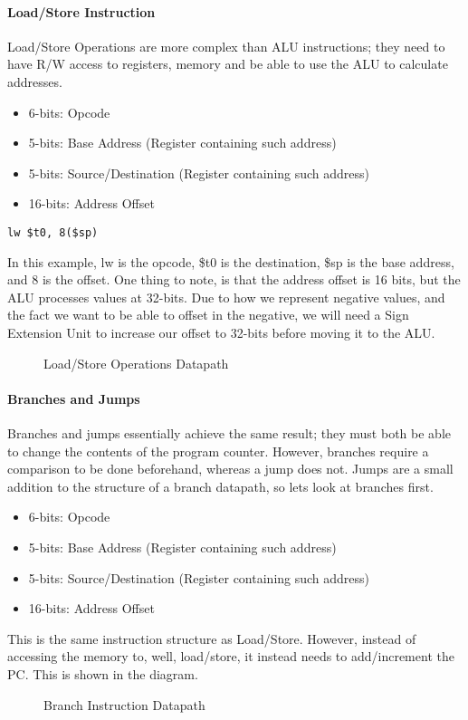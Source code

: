 \paragraph{Load/Store Instruction}
Load/Store Operations are more complex than ALU instructions; they need to have R/W access to registers, memory and be able to use the ALU to calculate addresses.
\begin{itemize}
	\item 6-bits: Opcode
	\item 5-bits: Base Address (Register containing such address)
	\item 5-bits: Source/Destination (Register containing such address)
	\item 16-bits: Address Offset
\end{itemize}
\begin{verbatim}
lw $t0, 8($sp)
\end{verbatim}
In this example, lw is the opcode, \$t0 is the destination, \$sp is the base address, and 8 is the offset.
One thing to note, is that the address offset is 16 bits, but the ALU processes values at 32-bits. Due to how we represent negative values, and the fact we want to be able to offset in the negative, we will need a Sign Extension Unit to increase our offset to 32-bits before moving it to the ALU.
\begin{figure}[!htb]
	\caption{\label{fig:loadstore} Load/Store Operations Datapath}
\end{figure}
\paragraph{Branches and Jumps}
Branches and jumps essentially achieve the same result; they must both be able to change the contents of the program counter. However, branches require a comparison to be done beforehand, whereas a jump does not. Jumps are a small addition to the structure of a branch datapath, so lets look at branches first.
\begin{itemize}
	\item 6-bits: Opcode
	\item 5-bits: Base Address (Register containing such address)
	\item 5-bits: Source/Destination (Register containing such address)
	\item 16-bits: Address Offset
\end{itemize}
This is the same instruction structure as Load/Store. However, instead of accessing the memory to, well, load/store, it instead needs to add/increment the PC. This is shown in the diagram.
\begin{figure}[!htb]
	\caption{\label{fig:branch} Branch Instruction Datapath}
\end{figure}
